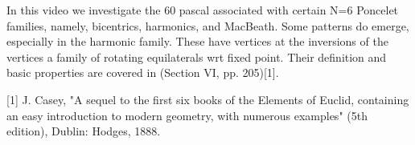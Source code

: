 In this video we investigate the 60 pascal associated with certain N=6 Poncelet families, namely, bicentrics, harmonics, and MacBeath. Some patterns do emerge, especially in the harmonic family. These have vertices at the inversions of the vertices a family of rotating equilaterals wrt fixed point. Their definition and basic properties are covered in (Section VI, pp. 205)[1].

[1] J. Casey, "A sequel to the first six books of the Elements of Euclid, containing an easy introduction to modern geometry, with numerous examples" (5th edition), Dublin: Hodges, 1888.